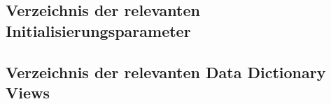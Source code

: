       \subsection{Verzeichnis der relevanten Initialisierungsparameter}
        \begin{literaturinternet}
          \item \cite{REFRN10019}
          \item \cite{REFRN10021}
          \item \cite{REFRN10033}
          \item \cite{REFRN10075}
          \item \cite{REFRN10079}
          \item \cite{REFRN10086}
          \item \cite{REFRN10089}
          \item \cite{REFRN10090}
          \item \cite{REFRN10091}
          \item \cite{REFRN10094}
          \item \cite{REFRN10284}
          \item \cite{REFRN10285}
          \item \cite{REFRN10123}
          \item \cite{REFRN10165}
          \item \cite{REFRN10202}
          \item \cite{REFRN10198}
          \item \cite{REFRN10256}
          \item \cite{REFRN10243}
          \item \cite{REFRN10214}
        \end{literaturinternet}
\clearpage
      \subsection{Verzeichnis der relevanten Data Dictionary Views}
        \begin{literaturinternet}
          \item \cite{REFRN29014}
          \item \cite{REFRN30007}
          \item \cite{sthref3187}
          \item \cite{REFRN30089}
          \item \cite{sthref3267}
          \item \cite{sthref3423}
          \item \cite{REFRN30129}
          \item \cite{REFRN30128}
          \item \cite{REFRN30159}
          \item \cite{REFRN30314}
          \item \cite{REFRN30275}
        \end{literaturinternet}
\clearpage
